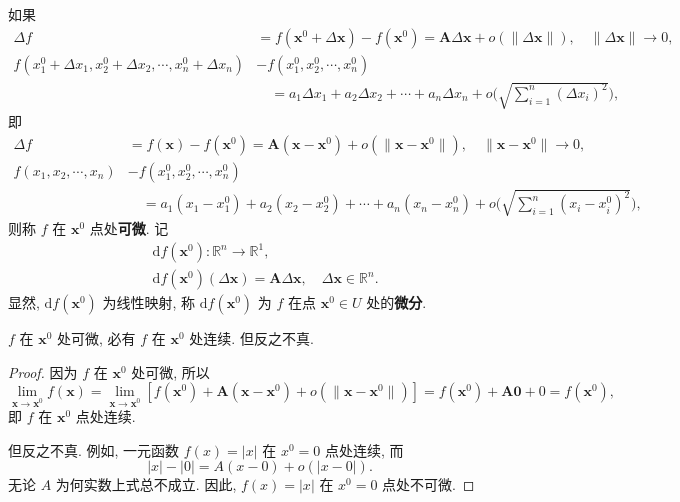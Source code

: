 \begin{definition}
如果
\begin{align*}
  \Delta f &= f(\boldsymbol{x}^{0} + \Delta\boldsymbol{x}) - f(\boldsymbol{x}^{0}) = \boldsymbol{A}\Delta\boldsymbol{x} + o(\|\Delta\boldsymbol{x}\|), \quad \|\Delta\boldsymbol{x}\| \to 0, \\
  f(x_{1}^{0} + \Delta x_{1}, x_{2}^{0} + \Delta x_{2}, \cdots, x_{n}^{0} + \Delta x_{n}) &- f(x_{1}^{0}, x_{2}^{0}, \cdots, x_{n}^{0}) \\
  &\quad = a_{1}\Delta x_{1} + a_{2}\Delta x_{2} + \cdots + a_{n}\Delta x_{n} + o\Big(\sqrt{\sum_{i=1}^{n}(\Delta x_{i})^{2}}\Big),
\end{align*}
即
\begin{align*}
  \Delta f &= f(\boldsymbol{x}) - f(\boldsymbol{x}^{0}) = \boldsymbol{A}(\boldsymbol{x} - \boldsymbol{x}^{0}) + o(\|\boldsymbol{x} - \boldsymbol{x}^{0}\|), \quad \|\boldsymbol{x} - \boldsymbol{x}^{0}\| \to 0, \\
  f(x_{1}, x_{2}, \cdots, x_{n}) &- f(x_{1}^{0}, x_{2}^{0}, \cdots, x_{n}^{0}) \\
  &\quad = a_{1}(x_{1} - x_{1}^{0}) + a_{2}(x_{2} - x_{2}^{0}) + \cdots + a_{n}(x_{n} - x_{n}^{0}) + o\Big(\sqrt{\sum_{i=1}^{n}(x_{i} - x_{i}^{0})^{2}}\Big),
\end{align*}
则称 $f$ 在 $\boldsymbol{x}^{0}$ 点处\textbf{可微}. 记
\begin{align*}
  &\mathrm{d}f(\boldsymbol{x}^{0}): \mathbb{R}^{n} \to \mathbb{R}^{1}, \\
  &\mathrm{d}f(\boldsymbol{x}^{0})(\Delta\boldsymbol{x}) = \boldsymbol{A}\Delta\boldsymbol{x}, \quad \Delta\boldsymbol{x} \in \mathbb{R}^{n}.
\end{align*}
显然, $\mathrm{d}f(\boldsymbol{x}^{0})$ 为线性映射, 称 $\mathrm{d}f(\boldsymbol{x}^{0})$ 为 $f$ 在点 $\boldsymbol{x}^{0} \in U$ 处的\textbf{微分}.
\end{definition}

\begin{theorem}\label{thm:8.2.1}
$f$ 在 $\boldsymbol{x}^{0}$ 处可微, 必有 $f$ 在 $\boldsymbol{x}^{0}$ 处连续. 但反之不真.
\end{theorem}

\begin{proof}
因为 $f$ 在 $\boldsymbol{x}^{0}$ 处可微, 所以
\[
  \lim_{\boldsymbol{x} \to \boldsymbol{x}^{0}}f(\boldsymbol{x}) = \lim_{\boldsymbol{x} \to \boldsymbol{x}^{0}}[f(\boldsymbol{x}^{0}) + \boldsymbol{A}(\boldsymbol{x} - \boldsymbol{x}^{0}) + o(\|\boldsymbol{x} - \boldsymbol{x}^{0}\|)] = f(\boldsymbol{x}^{0}) + \boldsymbol{A}\boldsymbol{0} + 0 = f(\boldsymbol{x}^{0}),
\]
即 $f$ 在 $\boldsymbol{x}^{0}$ 点处连续.

但反之不真. 例如, 一元函数 $f(x) = |x|$ 在 $x^{0} = 0$ 点处连续, 而
\[
  |x| - |0| = A(x - 0) + o(|x - 0|).
\]
无论 $A$ 为何实数上式总不成立. 因此, $f(x) = |x|$ 在 $x^{0} = 0$ 点处不可微.
\end{proof}

